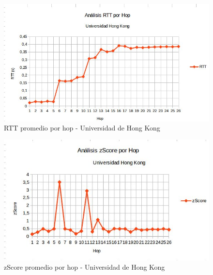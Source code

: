 \begin{figure}[H]
\centering
\includegraphics[width=1\textwidth]{graficos/rTT_HongKong.jpg}
\caption{RTT promedio por hop - Universidad de Hong Kong}
\label{hongkong_rtt}
\end{figure}

\begin{figure}[H]
\centering
\includegraphics[width=1\textwidth]{graficos/zScore_HongKong.jpg}
\caption{zScore promedio por hop - Universidad de Hong Kong}
\label{hongkong_zs}
\end{figure}
